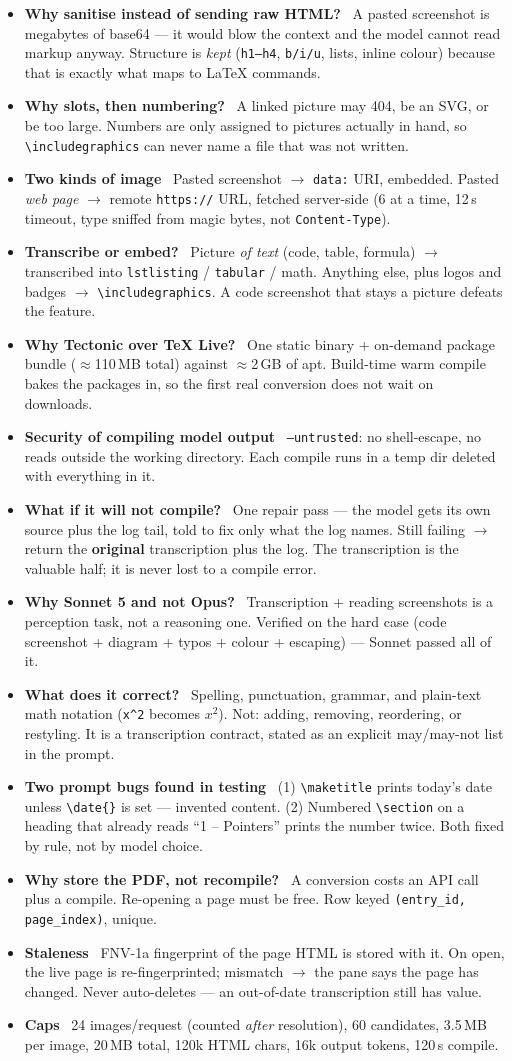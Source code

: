 \documentclass[10pt]{article}
\newcommand{\qa}[2]{\item \textbf{#1} \, #2}
\newcommand{\code}[1]{\texttt{\small #1}}
\begin{document}
\begin{itemize}
\qa{Why sanitise instead of sending raw HTML?}{A pasted screenshot is megabytes of base64 --- it would blow the context and the model cannot read markup anyway. Structure is \emph{kept} (\code{h1--h4}, \code{b/i/u}, lists, inline colour) because that is exactly what maps to LaTeX commands.}
\qa{Why slots, then numbering?}{A linked picture may 404, be an SVG, or be too large. Numbers are only assigned to pictures actually in hand, so \code{\textbackslash includegraphics} can never name a file that was not written.}
\qa{Two kinds of image}{Pasted screenshot $\to$ \code{data:} URI, embedded. Pasted \emph{web page} $\to$ remote \code{https://} URL, fetched server-side (6 at a time, 12\,s timeout, type sniffed from magic bytes, not \code{Content-Type}).}
\qa{Transcribe or embed?}{Picture \emph{of text} (code, table, formula) $\to$ transcribed into \code{lstlisting} / \code{tabular} / math. Anything else, plus logos and badges $\to$ \code{\textbackslash includegraphics}. A code screenshot that stays a picture defeats the feature.}
\qa{Why Tectonic over TeX Live?}{One static binary + on-demand package bundle ($\approx$110\,MB total) against $\approx$2\,GB of apt. Build-time warm compile bakes the packages in, so the first real conversion does not wait on downloads.}
\qa{Security of compiling model output}{\code{--untrusted}: no shell-escape, no reads outside the working directory. Each compile runs in a temp dir deleted with everything in it.}
\qa{What if it will not compile?}{One repair pass --- the model gets its own source plus the log tail, told to fix only what the log names. Still failing $\to$ return the \textbf{original} transcription plus the log. The transcription is the valuable half; it is never lost to a compile error.}
\qa{Why Sonnet 5 and not Opus?}{Transcription + reading screenshots is a perception task, not a reasoning one. Verified on the hard case (code screenshot + diagram + typos + colour + escaping) --- Sonnet passed all of it.}
\qa{What does it correct?}{Spelling, punctuation, grammar, and plain-text math notation (\code{x\textasciicircum{}2} becomes $x^{2}$). Not: adding, removing, reordering, or restyling. It is a transcription contract, stated as an explicit may/may-not list in the prompt.}
\qa{Two prompt bugs found in testing}{(1) \code{\textbackslash maketitle} prints today's date unless \code{\textbackslash date\{\}} is set --- invented content. (2) Numbered \code{\textbackslash section} on a heading that already reads ``1 -- Pointers'' prints the number twice. Both fixed by rule, not by model choice.}
\qa{Why store the PDF, not recompile?}{A conversion costs an API call plus a compile. Re-opening a page must be free. Row keyed \code{(entry\_id, page\_index)}, unique.}
\qa{Staleness}{FNV-1a fingerprint of the page HTML is stored with it. On open, the live page is re-fingerprinted; mismatch $\to$ the pane says the page has changed. Never auto-deletes --- an out-of-date transcription still has value.}
\qa{Caps}{24 images/request (counted \emph{after} resolution), 60 candidates, 3.5\,MB per image, 20\,MB total, 120k HTML chars, 16k output tokens, 120\,s compile.}
\end{itemize}
\end{document}
